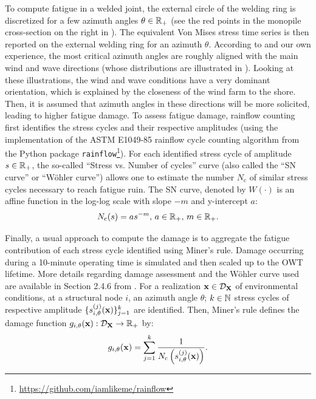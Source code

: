 To compute fatigue in a welded joint, the external circle of the welding ring is discretized for a few azimuth angles $\theta \in \mathbb{R}_+$ (see the red points in the monopile cross-section on the right in ). 
The equivalent Von Mises stress time series is then reported on the external welding ring for an azimuth $\theta$. 
According to \cite{li_zhan_2020} and our own experience, the most critical azimuth angles are roughly aligned with the main wind and wave directions (whose distributions are illustrated in ). 
Looking at these illustrations, the wind and wave conditions have a very dominant orientation, which is explained by the closeness of the wind farm to the shore. 
Then, it is assumed that azimuth angles in these directions will be more solicited, leading to higher fatigue damage. 
To assess fatigue damage, rainflow counting \citep{dowling_1972} first identifies the stress cycles and their respective amplitudes (using the implementation of the ASTM E1049-85 rainflow cycle counting algorithm from the Python package \texttt{rainflow}\footnote{\href{https://github.com/iamlikeme/rainflow}{https://github.com/iamlikeme/rainflow}}). 
For each identified stress cycle of amplitude $s \in \mathbb{R}_+$, the so-called ``Stress vs. Number of cycles'' curve (also called the ``SN curve'' or ``W\"ohler curve'') allows one to estimate the number $N_{\mathrm{c}}$ of similar stress cycles necessary to reach fatigue ruin. 
The SN curve, denoted by $W(\cdot)$ is an affine function in the log-log scale with slope $-m$ and y-intercept $a$:
\begin{equation}
    N_{\mathrm{c}}(s) = a s^{-m}, \, a\in\mathbb{R}_+, \, m\in\mathbb{R}_+.
    \label{eq:wohler}
\end{equation}

Finally, a usual approach to compute the damage is to aggregate the fatigue contribution of each stress cycle identified using Miner’s rule. 
Damage occurring during a 10-minute operating time is simulated and then scaled up to the OWT lifetime. 
More details regarding damage assessment and the W\"ohler curve used are available in Section 2.4.6 from \citep{dnv_fatigue_2016}. 
For a realization ${\bf x} \in \mathcal{D}_{{\bf X}}$ of environmental conditions, at a structural node $i$, an azimuth angle $\theta$; $k \in \mathbb{N}$ stress cycles of respective amplitude $\{s_{i, \theta}^{(j)}({\bf x})\}_{j=1}^k$ are identified. 
Then, Miner's rule \citep{fatemi_1998} defines the damage function $g_{i, \theta}({\bf x}): \mathcal{D}_{{\bf X}} \rightarrow \mathbb{R}_+$ by:
\begin{equation}
    g_{i, \theta}({\bf x}) = \sum_{j=1}^{k} \frac{1}{N_{\mathrm{c}}\left(s_{i, \theta}^{(j)}({\bf x})\right)}.
    \label{miner1}
\end{equation}


